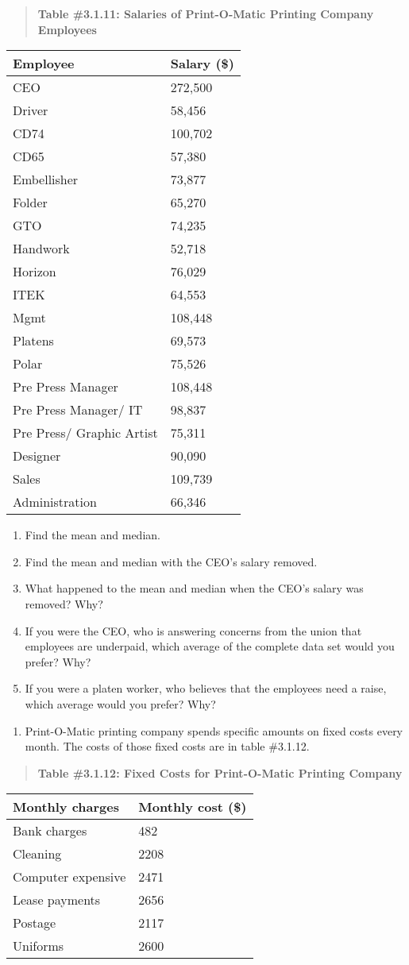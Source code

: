 \documentclass[]{book}
\providecommand{\tightlist}{%
  \setlength{\itemsep}{0pt}\setlength{\parskip}{0pt}}
\begin{document}
\begin{quote}
\textbf{Table \#3.1.11: Salaries of Print-O-Matic Printing Company
Employees}
\end{quote}

\begin{longtable}[]{@{}ll@{}}
\toprule
Employee & Salary (\$)\tabularnewline
\midrule
\endhead
CEO & 272,500\tabularnewline
Driver & 58,456\tabularnewline
CD74 & 100,702\tabularnewline
CD65 & 57,380\tabularnewline
Embellisher & 73,877\tabularnewline
Folder & 65,270\tabularnewline
GTO & 74,235\tabularnewline
Handwork & 52,718\tabularnewline
Horizon & 76,029\tabularnewline
ITEK & 64,553\tabularnewline
Mgmt & 108,448\tabularnewline
Platens & 69,573\tabularnewline
Polar & 75,526\tabularnewline
Pre Press Manager & 108,448\tabularnewline
Pre Press Manager/ IT & 98,837\tabularnewline
Pre Press/ Graphic Artist & 75,311\tabularnewline
Designer & 90,090\tabularnewline
Sales & 109,739\tabularnewline
Administration & 66,346\tabularnewline
\bottomrule
\end{longtable}

\begin{enumerate}
\def\labelenumi{\alph{enumi}.}
\item
  Find the mean and median.
\item
  Find the mean and median with the CEO's salary removed.
\item
  What happened to the mean and median when the CEO's salary was
  removed? Why?
\item
  If you were the CEO, who is answering concerns from the union that
  employees are underpaid, which average of the complete data set
  would you prefer? Why?
\item
  If you were a platen worker, who believes that the employees need a
  raise, which average would you prefer? Why?
\end{enumerate}

\begin{enumerate}
\def\labelenumi{\arabic{enumi}.}
\setcounter{enumi}{5}
\tightlist
\item
  Print-O-Matic printing company spends specific amounts on fixed
  costs every month. The costs of those fixed costs are in table
  \#3.1.12.
\end{enumerate}

\begin{quote}
\textbf{Table \#3.1.12: Fixed Costs for Print-O-Matic Printing Company}
\end{quote}

\begin{longtable}[]{@{}ll@{}}
\toprule
Monthly charges & Monthly cost (\$)\tabularnewline
\midrule
\endhead
Bank charges & 482\tabularnewline
Cleaning & 2208\tabularnewline
Computer expensive & 2471\tabularnewline
Lease payments & 2656\tabularnewline
Postage & 2117\tabularnewline
Uniforms & 2600\tabularnewline
\bottomrule
\end{longtable}
\end{document}
